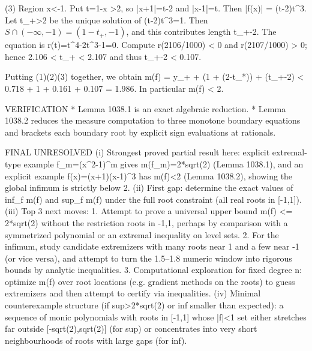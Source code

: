 (3) Region x<-1.  Put t=1-x >2, so |x+1|=t-2 and |x-1|=t. Then
  |f(x)| = (t-2)t^3.
Let t_+>2 be the unique solution of (t-2)t^3=1. Then \(S\cap(-\infty,-1) = (1-t_+, -1)\), and this contributes length t_+-2.
The equation is r(t)=t^4-2t^3-1=0. Compute r(2106/1000) < 0 and r(2107/1000) > 0; hence 2.106 < t_+ < 2.107 and thus t_+-2 < 0.107.

Putting (1)(2)(3) together, we obtain
  m(f) = y_+ + (1 + (2-t_*)) + (t_+-2)
      < 0.718 + 1 + 0.161 + 0.107
      = 1.986.
In particular m(f) < 2.

VERIFICATION
* Lemma 1038.1 is an exact algebraic reduction.
* Lemma 1038.2 reduces the measure computation to three monotone boundary equations and brackets each boundary root by explicit sign evaluations at rationals.

FINAL
UNRESOLVED
(i) Strongest proved partial result here: explicit extremal-type example f_m=(x^2-1)^m gives m(f_m)=2*sqrt(2) (Lemma 1038.1), and an explicit example f(x)=(x+1)(x-1)^3 has m(f)<2 (Lemma 1038.2), showing the global infimum is strictly below 2.
(ii) First gap: determine the exact values of inf_f m(f) and sup_f m(f) under the full root constraint (all real roots in [-1,1]).
(iii) Top 3 next moves:
  1. Attempt to prove a universal upper bound m(f) <= 2*sqrt(2) without the restriction roots in {-1,1}, perhaps by comparison with a symmetrized polynomial or an extremal inequality on level sets.
  2. For the infimum, study candidate extremizers with many roots near 1 and a few near -1 (or vice versa), and attempt to turn the 1.5--1.8 numeric window into rigorous bounds by analytic inequalities.
  3. Computational exploration for fixed degree n: optimize m(f) over root locations (e.g. gradient methods on the roots) to guess extremizers and then attempt to certify via inequalities.
(iv) Minimal counterexample structure (if sup>2*sqrt(2) or inf smaller than expected): a sequence of monic polynomials with roots in [-1,1] whose |f|<1 set either stretches far outside [-sqrt(2),sqrt(2)] (for sup) or concentrates into very short neighbourhoods of roots with large gaps (for inf).


